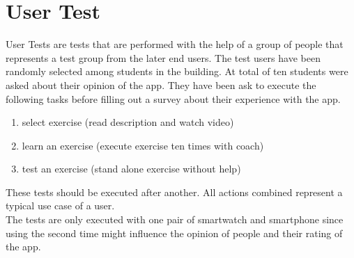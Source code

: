 \section{User Test}
User Tests are tests that are performed with the help of a group of people that represents a test group from the later end users. The test users have been randomly selected among students in the building. At total of ten students were asked about their opinion of the app. They have been ask to execute the following tasks before filling out a survey about their experience with the app.
\begin{enumerate}
\item select exercise (read description and watch video)
\item learn an exercise (execute exercise ten times with coach)
\item test an exercise (stand alone exercise without help)
\end{enumerate}

These tests should be executed after another. All actions combined represent a typical use case of a user.\\
The tests are only executed with one pair of smartwatch and smartphone since using the second time might influence the opinion of people and their rating of the app.

